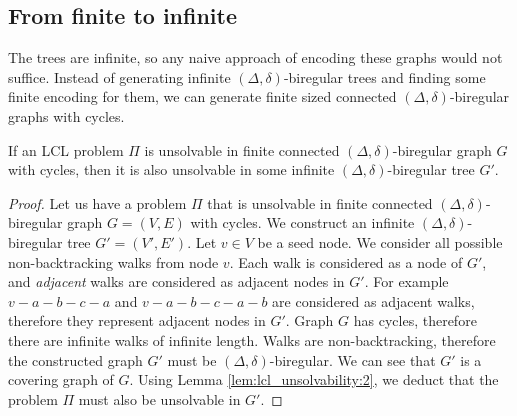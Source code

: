 %
%
\subsection{From finite to infinite} \label{sec:algorithm:from_finite_to_infinite}
The trees are infinite, so any naive approach of encoding these graphs would not suffice.
Instead of generating infinite $(\Delta, \delta)$-biregular trees and finding some finite encoding for them, we can generate finite sized connected $(\Delta, \delta)$-biregular graphs with cycles.

\begin{lemma} \label{lem:from_finite_to_infinite}
    If an LCL problem $\Pi$ is unsolvable in finite connected $(\Delta, \delta)$-biregular graph $G$ with cycles, then it is also unsolvable in some infinite $(\Delta, \delta)$-biregular tree $G'$.
\end{lemma}
\begin{proof}
    Let us have a problem $\Pi$ that is unsolvable in finite connected $(\Delta, \delta)$-biregular graph $G=(V, E)$ with cycles.
    We construct an infinite $(\Delta, \delta)$-biregular tree $G'=(V', E')$.
    Let $v \in V$ be a seed node.
    We consider all possible non-backtracking walks from node $v$.
    Each walk is considered as a node of $G'$, and \emph{adjacent} walks are considered as adjacent nodes in $G'$.
    For example $v-a-b-c-a$ and $v-a-b-c-a-b$ are considered as adjacent walks, therefore they represent adjacent nodes in $G'$.
    Graph $G$ has cycles, therefore there are infinite walks of infinite length.
    Walks are non-backtracking, therefore the constructed graph $G'$ must be $(\Delta, \delta)$-biregular.
    We can see that $G'$ is a covering graph of $G$.
    Using Lemma \ref{lem:lcl_unsolvability:2}, we deduct that the problem $\Pi$ must also be unsolvable in $G'$.
\end{proof}

